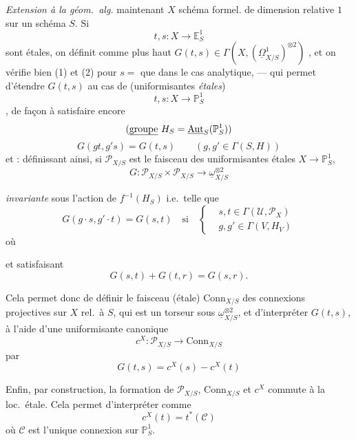 \documentclass[11pt,a4paper]{article}
\begin{document}
\emph{Extension à la géom.\ alg.} \quad {} maintenant $X$ schéma formel.   de dimension relative $1$ sur un schéma $S$. Si  \ill{}
\[
t,s:X\to\mathbb{E}^1_S
\]
 sont \add{\uncertain{\ill{}}} étales, on définit comme plus haut $G(t,s)\in\Gamma(X,(\underline{\Omega}^1_{X/S})^{\otimes2})$ , et on vérifie bien  (1) et (2) pour $s=$ \uncertain{\ill{}} \uncertain{\ill{}} que dans le cas analytique, — qui permet d'étendre $G(t,s)$ au cas de (uniformisantes \emph{étales})
\[
t,s:X\to\mathbb{P}^1_S
\]
\struck{\ill{}}, de façon à satisfaire encore 
\[
\text{(\uncertain{groupe} }H_S=\underline{\mathrm{Aut}}_S(\mathbb{P}^1_S))
\]
\[
G(gt,g's)=G(t,s)\qquad(g,g'\in\Gamma(S,H))
\]
et : définissant ainsi, si $\mathcal{P}_{X/S}$ est le faisceau  des uniformisantes étales $X\to\mathbb{P}^1_S$, 
\[
G:\mathcal{P}_{X/S}\times\mathcal{P}_{X/S}\to\underline{\omega}^{\otimes2}_{X/S}
\]

\emph{invariante} sous l'action de $f^{-1}(H_S)$ i.e.\ telle que
\[
G(g\cdot s,g'\cdot t)=G(s,t)\quad\text{si}\quad
\left\{
\begin{aligned}
&s,t\in\Gamma(\mathcal{U},\mathcal{P}_X)\\
&g,g'\in\Gamma(V,H_V)
\end{aligned}
\right.
\]
où


et satisfaisant
\[
G(s,t)+G(t,r)=G(s,r).
\]

Cela permet donc de définir le faisceau (étale) $\mathrm{Conn}_{X/S}$ des connexions projectives sur $X$ rel.\ à $S$, qui est un torseur sous $\underline{\omega}^{\otimes2}_{X/S}$, et d'interpréter $G(t,s)$, à l'aide d'une uniformisante canonique
\[
c^X:\mathcal{P}_{X/S}\to\mathrm{Conn}_{X/S}
\]
par
\[
G(t,s)=c^X(s)-c^X(t)
\]

Enfin, par construction, la formation de $\mathcal{P}_{X/S}$, $\mathrm{Conn}_{X/S}$ et $c^X$ commute à la loc.\ étale. Cela permet d'interpréter comme
\[
c^X(t)=t^*(\mathcal{C})
\]
où $\mathcal{C}$ est l'unique connexion sur $\mathbb{P}^1_S$.
\end{document}
